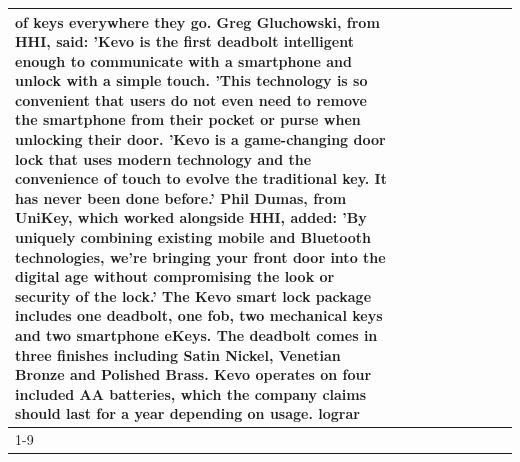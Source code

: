 \begin{table}[H]
\begin{tabular}{lllrlllll}
of keys everywhere they go. Greg Gluchowski, from HHI, said: 'Kevo is the first deadbolt intelligent enough to communicate with a smartphone and unlock with a simple touch. 'This technology is so convenient that users do not even need to remove the smartphone from their pocket or purse when unlocking their door. 'Kevo is a game-changing door lock that uses modern technology and the convenience of touch to evolve the traditional key. It has never been done before.' Phil Dumas, from UniKey, which worked alongside HHI, added: 'By uniquely combining existing mobile and Bluetooth technologies, we’re bringing your front door into the digital age without compromising the look or security of the lock.' The Kevo smart lock package includes one deadbolt, one fob, two mechanical keys and two smartphone eKeys. The deadbolt comes in three finishes including Satin Nickel, Venetian Bronze and Polished Brass. Kevo operates on four included AA batteries, which the company claims should last for a year depending on usage. lograr \\
\cline{1-9}

\end{tabular}
\end{table}
